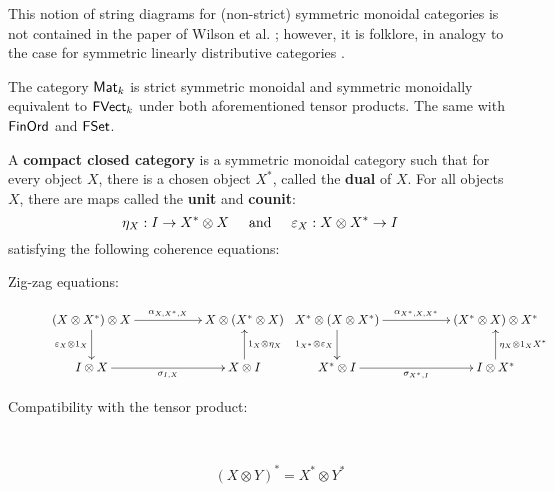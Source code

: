 This notion of string diagrams for (non-strict) symmetric monoidal categories is not contained in the paper of Wilson et al. \cite{wilson}; however, it is folklore, in analogy to the case for symmetric linearly distributive categories \cite{ldc}.
\begin{example}
The category $\Mat_k$ is strict symmetric monoidal  and symmetric monoidally equivalent to $\FVect_k$ under both aforementioned tensor products.  The same with $\FinOrd$ and $\FSets$.
\end{example}
\begin{definition}
A {\bf compact closed category} is a symmetric monoidal category such that for every object $X$, there is a chosen object $X^*$, called the {\bf dual} of $X$.
For all objects $X$, there are maps called the {\bf unit} and {\bf counit}:
$$
\eta_X:I\to X^* \otimes X\hspace*{.5cm}\text{and}\hspace*{.5cm} \epsilon_X:X\otimes X^*\to I 
$$
satisfying the following coherence equations:
\begin{description}
\item[Zig-zag equations:]
$$
\xymatrix{
  (X\otimes X^*)\otimes X \ar[rr]^{\alpha_{X,X^*,X}}  \ar[d]_{\epsilon_X\otimes 1_X}
    & 
    & X\otimes(X^*\otimes X)
  \\I\otimes X \ar[rr]_{\sigma_{I,X}}
    &
    & X\otimes I \ar[u]_{1_X\otimes \eta_X}
}
\hspace*{.1cm}
\xymatrix{
  X^*\otimes ( X\otimes X^*) \ar[rr]^{\alpha_{X^*,X,X^*}}  \ar[d]_{1_{X^*}\otimes \epsilon_X}
    & 
    & (X^* \otimes X)\otimes X^*
  \\X^*\otimes I \ar[rr]_{\sigma_{X^*,I}}
    &
    & I\otimes X^* \ar[u]_{\eta_X\otimes 1_X{X^*}}
}
$$
\item[Compatibility with the tensor product:]\

$$(X\otimes Y)^* = X^* \otimes Y^*$$


\end{description}
\end{definition}
